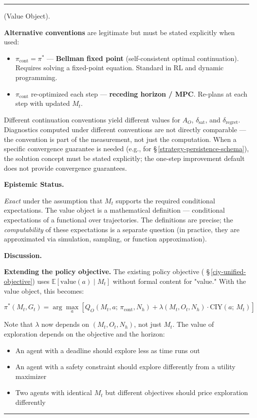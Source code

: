 \documentclass[11pt,oneside]{article}
\newcounter{claim}[section]
\renewcommand{\theclaim}{\thesection.\arabic{claim}}
\newenvironment{segment}[2]{%
  \refstepcounter{claim}%
  \bigskip\noindent\hrule\smallskip
  \noindent{\bfseries #1~\theclaim}\enskip(#2).\par\smallskip
  \noindent\ignorespaces
}{%
  \par\smallskip\noindent\hrule\bigskip
}
\newenvironment{definition}[1][]{\begin{segment}{Definition}{#1}}{\end{segment}}
\begin{document}
\begin{definition}[Value Object]
\textbf{Alternative conventions} are legitimate but must be stated explicitly when used:

\begin{itemize}
  \item $\pi_{\text{cont}} = \pi^*$ — \textbf{Bellman fixed point} (self-consistent optimal continuation). Requires solving a fixed-point equation. Standard in RL and dynamic programming.
  \item $\pi_{\text{cont}}$ re-optimized each step — \textbf{receding horizon / MPC}. Re-plans at each step with updated $M_t$.
\end{itemize}


Different continuation conventions yield different values for $A_O$, $\delta_{\text{sat}}$, and $\delta_{\text{regret}}$. Diagnostics computed under different conventions are not directly comparable — the convention is part of the measurement, not just the computation. When a specific convergence guarantee is needed (e.g., for \S\,\ref{strategy-persistence-schema}), the solution concept must be stated explicitly; the one-step improvement default does not provide convergence guarantees.


\medskip\noindent\textbf{Epistemic Status.}


\textit{Exact} under the assumption that $M_t$ supports the required conditional expectations. The value object is a mathematical definition — conditional expectations of a functional over trajectories. The definitions are precise; the \textit{computability} of these expectations is a separate question (in practice, they are approximated via simulation, sampling, or function approximation).


\medskip\noindent\textbf{Discussion.}


\textbf{Extending the policy objective.} The existing policy objective ( \S\,\ref{ciy-unified-objective}) uses $\mathbb{E}[\text{value}(a) \mid M_t]$ without formal content for "value." With the value object, this becomes:


$$\pi^*(M_t, G_t) = \arg\max_a \left[Q_O(M_t, a;\, \pi_{\text{cont}}, N_h) + \lambda(M_t, O_t, N_h) \cdot \text{CIY}(a;\, M_t)\right]$$

Note that $\lambda$ now depends on $(M_t, O_t, N_h)$, not just $M_t$. The value of exploration depends on the objective and the horizon:
\begin{itemize}
  \item An agent with a deadline should explore less as time runs out
  \item An agent with a safety constraint should explore differently from a utility maximizer
  \item Two agents with identical $M_t$ but different objectives should price exploration differently
\end{itemize}



\end{definition}
\end{document}
